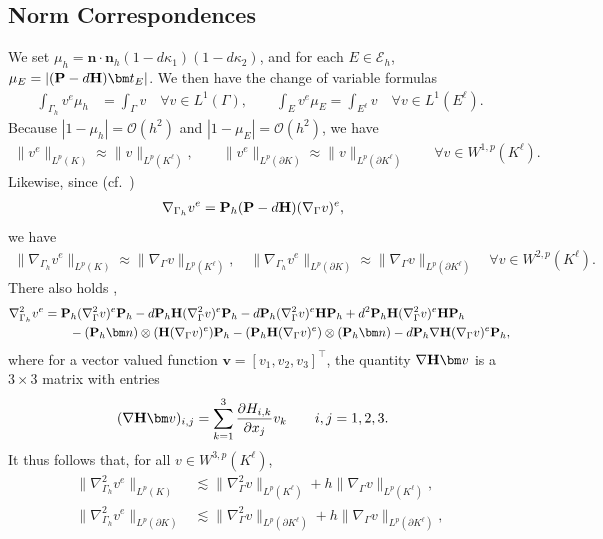 \documentclass[10pt, a4paper]{amsart}
\newcommand{\bn}{{\bm n}}
\newcommand{\bt}{{\bm t}}
\newcommand{\bv}{{\bm v}}
\newcommand{\p}{\partial}
\newcommand{\nab}{\nabla}
\newcommand{\calE}{\mathcal{E}}
\newcommand{\calO}{\mathcal{O}}
\theoremstyle{definition}
\theoremstyle{remark}
\theoremstyle{example}
\numberwithin{equation}{section}
\begin{document}
\subsection{Norm Correspondences}
We set $\mu_h = \bn \cdot \bn_h(1 - d\kappa_1)(1 - d\kappa_2)$,
and for each $E\in \calE_h$,
$\mu_E = |({\bf P}-d{\bf H})\bt_E|$.
We then have the change of variable formulas \cite{Demlow09,CockburnDemlow16} 
\begin{align*}
\int_{\Gamma_h} v^e \mu_h &= \int_\Gamma v\quad \forall v\in L^1(\Gamma),\qquad
\int_{E} v^e \mu_E = \int_{E^\ell} v\quad \forall v\in L^1(E^\ell).
\end{align*}
Because $|1-\mu_h| = \calO(h^2)$ and $|1-\mu_E| = \calO(h^2)$, we have
\begin{align}
\|v^e\|_{L^p(K)} \approx \|v\|_{L^p(K^\ell)}, \qquad \|v^e\|_{L^p(\p K)}\approx \|v\|_{L^p(\p K^\ell)} \qquad \forall v\in W^{1,p}(K^\ell). \label{250921-1}
\end{align}
%
Likewise, since (cf.~\cite{demlow2007adaptive})
\begin{align}
\nab_{\Gamma_h} v^e
& = {\bf P}_h({\bf P} - d {\bf H})(\nab_\Gamma v)^e, \label{250914-1}
\end{align}
we have
\begin{align}
        \label{eqn:GradEquivBound}
\|\nab_{\Gamma_h} v^e\|_{L^p(K)}\approx \|\nab_\Gamma v\|_{L^p(K^\ell)},\quad
\|\nab_{\Gamma_h} v^e\|_{L^p(\p K)}\approx \|\nab_\Gamma v\|_{L^p(\p K^\ell)}\quad
\forall v\in W^{2,p}(K^\ell).
\end{align}
There also holds \cite{LarssonLarson17,neilan2025c0},
\begin{align*}
\nab_{\Gamma_h}^2v^e
& = {\bf P}_h(\nab_\Gamma^2v)^e{\bf P}_h
- d{\bf P}_h{\bf H}(\nab_\Gamma^2v)^e{\bf P}_h - d{\bf P}_h(\nab_\Gamma^2v)^e{\bf H}{\bf P}_h + d^2{\bf P}_h{\bf H}(\nab_\Gamma^2v)^e{\bf H}{\bf P}_h \\
& \qquad - ({\bf P}_h\bn) \otimes ({\bf H}(\nab_\Gamma v)^e){\bf P}_h - ({\bf P}_h{\bf H}(\nab_\Gamma v)^e) \otimes ({\bf P}_h\bn)
 - d{\bf P}_h\nab{\bf H}(\nab_\Gamma v)^e{\bf P}_h,
\end{align*}
where for a vector valued function $\bv=[v_1,v_2,v_3]^\intercal$,
the quantity $\nab {\bf H} \bv$ is a $3 \times 3$ matrix with entries
\begin{align}
(\nab{\bf H}\bv)_{i, j}
& = \sum_{k = 1}^3\frac{\p H_{i, k}}{\p x_j}v_k \qquad i, j = 1, 2, 3. \label{250909-3}
\end{align}
It thus follows that, for all $v \in W^{3,p}(K^\ell)$,
\begin{equation}
    \label{eqn:HessEquivBound}
\begin{split}
\|\nab_{\Gamma_h}^2 v^e\|_{L^p(K)}
&\lesssim \|\nab_{\Gamma}^2 v\|_{L^p(K^\ell)}
+ h \|\nab_\Gamma v\|_{L^p(K^\ell)},\\
%
\|\nab_{\Gamma_h}^2 v^e\|_{L^p(\p K)}
&\lesssim \|\nab_{\Gamma}^2 v\|_{L^p(\p K^\ell)}
+ h \|\nab_\Gamma v\|_{L^p(\p K^\ell)},
\end{split}
\end{equation}
\end{document}
